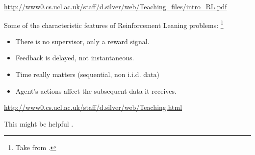 \documentclass{beamer}
\begin{document}
\begin{frame}
	\urldef\rlOne\url{http://www0.cs.ucl.ac.uk/staff/d.silver/web/Teaching_files/intro_RL.pdf}
	
	Some of the characteristic features of Reinforcement Leaning problems: \footnote{Take from \rlOne.}
	
	\begin{itemize}
		\item There is no supervisor, only a reward signal.
		\item Feedback is delayed, not instantaneous.
		\item Time really matters (sequential, non i.i.d. data)
		\item Agent's actions affect the subsequent data it receives.
	\end{itemize}
\end{frame}

\begin{frame}
	\urldef\rl\url{http://www0.cs.ucl.ac.uk/staff/d.silver/web/Teaching.html}
	
	This might be helpful \rl.
	
\end{frame}
	
	
\end{document}
